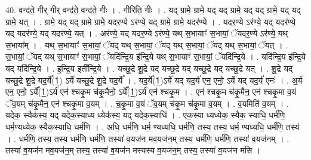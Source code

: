 \documentclass[17pt]{extarticle}
\begin{document}
40. वन्द॑ते॒ गीर् गीर् वन्द॑ते॒ वन्द॑ते॒ गीः । . गीरिति॒ गीः । . यद् ग्रामे॒ ग्रामे॒ यद् यद् ग्रामे॒ यद् यद् ग्रामे॒ यद् यद् ग्रामे॒ यत् । . ग्रामे॒ यद् यद् ग्रामे॒ ग्रामे॒ यदर॒ण्ये ऽर॑ण्ये॒ यद् ग्रामे॒ ग्रामे॒ यदर॑ण्ये । . यदर॒ण्ये ऽर॑ण्ये॒ यद् यदर॑ण्ये॒ यद् यदर॑ण्ये॒ यद् यदर॑ण्ये॒ यत् । . अर॑ण्ये॒ यद् यदर॒ण्ये ऽर॑ण्ये॒ यथ् स॒भायाꣳ॑ स॒भायां॒ ॅयदर॒ण्ये ऽर॑ण्ये॒ यथ् स॒भाया᳚म् । . यथ् स॒भायाꣳ॑ स॒भायां॒ ॅयद् यथ् स॒भायां॒ ॅयद् यथ् स॒भायां॒ ॅयद् यथ् स॒भायां॒ ॅयत् । . स॒भायां॒ ॅयद् यथ् स॒भायाꣳ॑ स॒भायां॒ ॅयदि॑न्द्रि॒य इ॑न्द्रि॒ये यथ् स॒भायाꣳ॑ स॒भायां॒ ॅयदि॑न्द्रि॒ये । . यदि॑न्द्रि॒य इ॑न्द्रि॒ये यद् यदि॑न्द्रि॒ये । . इ॒न्द्रि॒य इती᳚न्द्रि॒ये । . यच्छू॒द्रे शू॒द्रे यद् यच्छू॒द्रे यद् यच्छू॒द्रे यद् यच्छू॒द्रे यत् । . शू॒द्रे यद् यच्छू॒द्रे शू॒द्रे यद॒र्ये᳚(1॒) ऽर्ये॑ यच्छू॒द्रे शू॒द्रे यद॒र्ये᳚ । . यद॒र्ये᳚(1॒)ऽर्ये॑ यद् यद॒र्य॑ एन॒ एनो॒ ऽर्ये॑ यद् यद॒र्य॑ एनः॑ । . अ॒र्य॑ एन॒ एनो॒ ऽर्ये᳚(1॒)ऽर्य॑ एन॑ श्चकृ॒म च॑कृ॒मैनो॒ ऽर्ये᳚(1॒)ऽर्य॑ एन॑ श्चकृ॒म । . एन॑ श्चकृ॒म च॑कृ॒मैन॒ एन॑ श्चकृ॒मा व॒यं ॅव॒यम् च॑कृ॒मैन॒ एन॑ श्चकृ॒मा व॒यम् । . च॒कृ॒मा व॒यं ॅव॒यम् च॑कृ॒म च॑कृ॒मा व॒यम् । . व॒यमिति॑ व॒यम् । . यदेक॒ स्यैक॑स्य॒ यद् यदेक॒स्याध्य ध्येक॑स्य॒ यद् यदेक॒स्याधि॑ । . एक॒स्या ध्यध्येक॒ स्यैक॒ स्याधि॒ धर्म॑णि॒ धर्म॒ण्यध्येक॒ स्यैक॒स्याधि॒ धर्म॑णि । . अधि॒ धर्म॑णि॒ धर्म॒ ण्यध्यधि॒ धर्म॑णि॒ तस्य॒ तस्य॒ धर्म॒ ण्यध्यधि॒ धर्म॑णि॒ तस्य॑ । . धर्म॑णि॒ तस्य॒ तस्य॒ धर्म॑णि॒ धर्म॑णि॒ तस्या॑ व॒यज॑न मव॒यज॑न॒म् तस्य॒ धर्म॑णि॒ धर्म॑णि॒ तस्या॑ व॒यज॑नम् । . तस्या॑ व॒यज॑न मव॒यज॑न॒म् तस्य॒ तस्या॑ व॒यज॑न मस्यस्य व॒यज॑न॒म् तस्य॒ तस्या॑ व॒यज॑न मसि । \newline
\end{document}
